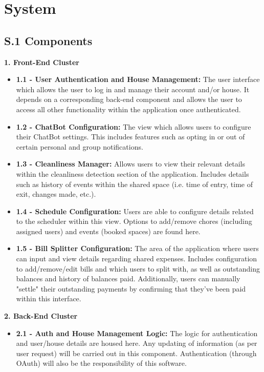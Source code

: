 \documentclass{scrreprt}
\newcommand*{\nsection}[1]{
    \section*{#1}
    \addcontentsline{toc}{section}{#1}
}
\theoremstyle{definition}
\begin{document}
\chapter*{System}
\setcounter{mtc}{3}
\minitoc%

\nsection{S.1 Components}

\begin{flushleft}
  \item \textbf{1. Front-End Cluster}
  \begin{itemize}
  	\item \textbf{1.1 - User Authentication and House Management:} The user interface which allows the user to log in and manage their account and/or house. It depends on a corresponding back-end component and allows the user to access all other functionality within the application once authenticated.
  	\item \textbf{1.2 - ChatBot Configuration:} The view which allows users to configure their ChatBot settings. This includes features such as opting in or out of certain personal and group notifications.
  	\item \textbf{1.3 - Cleanliness Manager:} Allows users to view their relevant details within the cleanliness detection section of the application. Includes details such as history of events within the shared space (i.e. time of entry, time of exit, changes made, etc.).
  	\item \textbf{1.4 - Schedule Configuration:} Users are able to configure details related to the scheduler within this view. Options to add/remove chores (including assigned users) and events (booked spaces) are found here.
  	\item \textbf{1.5 - Bill Splitter Configuration:} The area of the application where users can input and view details regarding shared expenses. Includes configuration to add/remove/edit bills and which users to split with, as well as outstanding balances and history of balances paid. Additionally, users can manually "settle" their outstanding payments by confirming that they've been paid within this interface.
  	\end{itemize}
  \item \textbf{2. Back-End Cluster}
   \begin{itemize}
   \item \textbf{2.1 - Auth and House Management Logic:} The logic for authentication and user/house details are housed here. Any updating of information (as per user request) will be carried out in this component. Authentication (through OAuth) will also be the responsibility of this software.

\end{itemize}
\end{flushleft}
\end{document}
